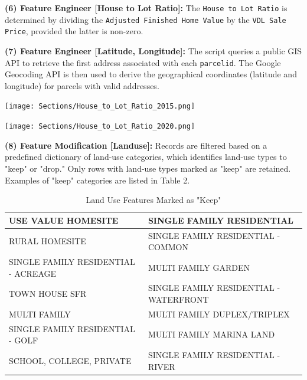 \textbf{(6) Feature Engineer [House to Lot Ratio]:} The \texttt{House to Lot
Ratio} is determined by dividing the \texttt{Adjusted Finished Home Value} by
the \texttt{VDL Sale Price}, provided the latter is non-zero.

\textbf{(7) Feature Engineer [Latitude, Longitude]:} The script queries a public
GIS API to retrieve the first address associated with each \texttt{parcelid}. The
Google Geocoding API is then used to derive the geographical coordinates (latitude
and longitude) for parcels with valid addresses.

\begin{minipage}[t]{0.48\textwidth}
	\centering
	\texttt{[image: Sections/House\_to\_Lot\_Ratio\_2015.png]}
\end{minipage}%
\hfill
\begin{minipage}[t]{0.48\textwidth}
	\centering
	\texttt{[image: Sections/House\_to\_Lot\_Ratio\_2020.png]}
\end{minipage}

\textbf{(8) Feature Modification [Landuse]:} Records are filtered based on a
predefined dictionary of land-use categories, which identifies land-use types to
"keep" or "drop." Only rows with land-use types marked as "keep" are retained. Examples
of "keep" categories are listed in Table 2.
\begin{table}[h!]
	\centering
	\caption{Land Use Features Marked as "Keep"}
	\renewcommand{\arraystretch}{1} %
	\setlength{\tabcolsep}{8pt} %
	\begin{tabular}{|l|l|}
		\hline
		USE VALUE HOMESITE                  & SINGLE FAMILY RESIDENTIAL              \\
		\hline
		RURAL HOMESITE                      & SINGLE FAMILY RESIDENTIAL - COMMON     \\
		\hline
		SINGLE FAMILY RESIDENTIAL - ACREAGE & MULTI FAMILY GARDEN                    \\
		\hline
		TOWN HOUSE SFR                      & SINGLE FAMILY RESIDENTIAL - WATERFRONT \\
		\hline
		MULTI FAMILY                        & MULTI FAMILY DUPLEX/TRIPLEX            \\
		\hline
		SINGLE FAMILY RESIDENTIAL - GOLF    & MULTI FAMILY MARINA LAND               \\
		\hline
		SCHOOL, COLLEGE, PRIVATE            & SINGLE FAMILY RESIDENTIAL - RIVER      \\
		\hline
	\end{tabular}
\end{table}

